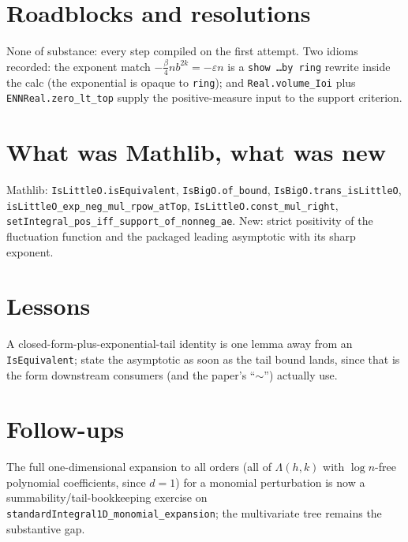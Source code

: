 \documentclass[11pt]{article}
\begin{document}
\section{Roadblocks and resolutions}
None of substance: every step compiled on the first attempt. Two idioms recorded: the exponent match
$-\tfrac\beta4nb^{2k}=-\varepsilon n$ is a \texttt{show \dots by ring} rewrite inside the calc (the
exponential is opaque to \texttt{ring}); and \texttt{Real.volume\_Ioi} plus \texttt{ENNReal.zero\_lt\_top}
supply the positive-measure input to the support criterion.

\section{What was Mathlib, what was new}
Mathlib: \texttt{IsLittleO.isEquivalent}, \texttt{IsBigO.of\_bound}, \texttt{IsBigO.trans\_isLittleO},
\texttt{isLittleO\_exp\_neg\_mul\_rpow\_atTop}, \texttt{IsLittleO.const\_mul\_right},
\texttt{setIntegral\_pos\_iff\_support\_of\_nonneg\_ae}. New: strict positivity of the fluctuation
function and the packaged leading asymptotic with its sharp exponent.

\section{Lessons}
A closed-form-plus-exponential-tail identity is one lemma away from an \texttt{IsEquivalent}; state
the asymptotic as soon as the tail bound lands, since that is the form downstream consumers (and the
paper's ``$\sim$'') actually use.

\section{Follow-ups}
The full one-dimensional expansion to all orders (all of $\Lambda(h,k)$ with $\log n$-free polynomial
coefficients, since $d=1$) for a monomial perturbation is now a summability/tail-bookkeeping exercise on
\texttt{standardIntegral1D\_monomial\_expansion}; the multivariate tree remains the substantive gap.
\end{document}
